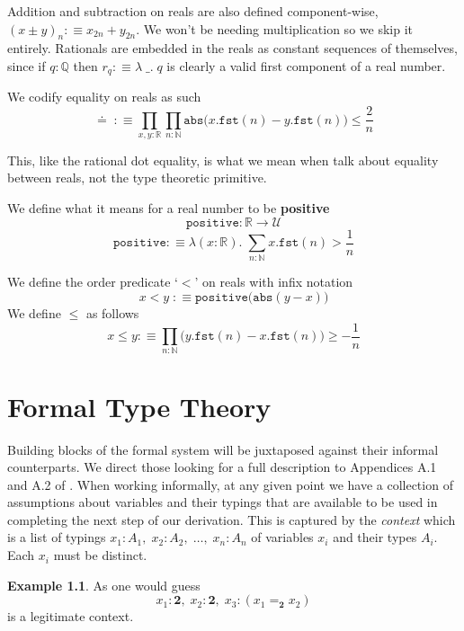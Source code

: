 \documentclass[12pt]{report}
\newtheorem{prop}[thm]{Proposition}
\theoremstyle{definition}
\newtheorem{exmp}[thm]{Example}
\begin{document}
Addition and subtraction on reals are also defined component-wise, $(x \pm y)_n :\equiv x_{2n} + y_{2n}$. 
We won't be needing multiplication so we skip it entirely. 
Rationals are embedded in the reals as constant sequences of themselves, since if $q : \mathbb{Q}$ then $r_q :\equiv \lambda\;\_.\; q$ is clearly a valid first component of a real number. 

We codify equality on reals as such
$$\doteq\;:\equiv \prod_{x,y : \mathbb{R}} \prod_{n : \mathbb{N}} \mathtt{abs}\big( x.\mathtt{fst}(n) - y.\mathtt{fst}(n)\big) \leq \frac{2}{n}$$

This, like the rational dot equality, is what we mean when talk about equality between reals, not the type theoretic primitive. 

We define what it means for a real number to be \textbf{positive}
$$\mathtt{positive}  :\mathbb{R} \rightarrow \mathcal{U}$$
$$\mathtt{positive} :\equiv \lambda(x: \mathbb{R}).\; \sum_{n : \mathbb{N}} x.\mathtt{fst}(n) > \frac{1}{n}$$

We define the order predicate `$<$' on reals with infix notation
$$x<y\; :\equiv \mathtt{positive}\big( \mathtt{abs}(y-x) \big)$$
We define $\leq$ as follows
$$x \leq y :\equiv \prod_{n : \mathbb{N}} \big( y.\mathtt{fst}(n) - x.\mathtt{fst}(n) \big) \geq -\frac{1}{n}$$
\chapter{Formal Type Theory}\label{formalTT}
Building blocks of the formal system will be juxtaposed against their informal counterparts. 
We direct those looking for a full description to Appendices A.1 and A.2 of \cite{hottbook}. 
When working informally, at any given point we have a collection of assumptions about variables and their typings that are available to be used in completing the next step of our derivation. 
This is captured by the \textit{context} which is a list of typings $x_1 : A_1,\; x_2 : A_2,\;\ldots,\;x_n : A_n$ of variables $x_i$ and their types $A_i$. 
Each $x_i$ must be distinct. 
\begin{exmp}
As one would guess
$$x_1 : \mathbf{2},\; x_2 : \mathbf{2},\; x_3 : (x_1=_\mathbf{2} x_2)$$
is a legitimate context. 
\end{exmp}
\end{document}
